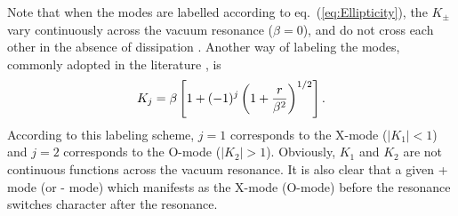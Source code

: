 \documentclass[useAMS,onecolumn,usenatbib,usegraphicx]{mn2e}
\begin{document}
Note that when the modes are labelled according to eq.~(\ref{eq:Ellipticity}), the $K_{\pm}$ vary continuously across 
the vacuum resonance 
($\beta=0$), and do not cross each other in the absence of dissipation \citep[][]{LaiHo03a}.  Another 
way of labeling the modes, commonly adopted in the literature \citep[e.g.][]{Meszaros92a}, is 
\begin{eqnarray}
\label{eq:EllipticityXO}
K_j = \beta\left[1+(-1)^j\left(1+{r\over\beta^2}\right)^{1/2}\right].
\end{eqnarray}
According to this labeling scheme, $j=1$ corresponds to the X-mode ($|K_1|<1$) and $j=2$ corresponds to the O-mode ($|K_2|>1$).
Obviously, $K_{1}$ and $K_2$ are not continuous functions across the vacuum resonance.  
It is also clear that a given + mode (or - mode) 
which manifests as the X-mode (O-mode) before the resonance switches character after the resonance.
\end{document}
